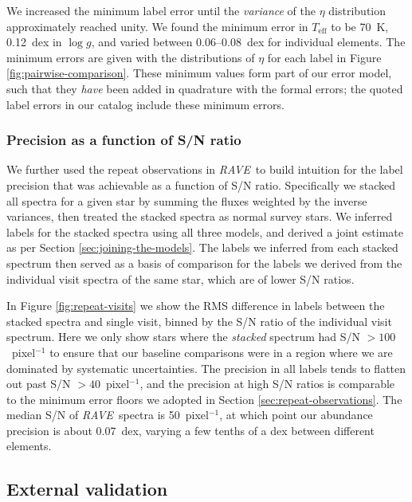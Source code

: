 \documentclass[preprint]{aastex}
\newcommand{\acronym}[1]{{\small{#1}}}
\newcommand{\project}[1]{\textsl{#1}}
\newcommand{\rave}{\project{\acronym{RAVE}}}
\newcommand{\teff}{T_{\mathrm{eff}}}
\newcommand{\logg}{\log g}
\begin{document}
We increased the minimum label error until the \emph{variance} of the $\eta$ 
distribution approximately reached unity.  We found the minimum error in
$\teff$ to be 70~K, 0.12~dex in $\logg$, and varied between 0.06--0.08~dex
for individual elements.  The minimum errors are given with the 
distributions of $\eta$ for each label in Figure \ref{fig:pairwise-comparison}.
These minimum values form part of our error model, such that they \emph{have} 
been added in quadrature with the formal errors; the quoted label errors 
in our catalog include these minimum errors.


\subsubsection{Precision as a function of S/N ratio}
\label{sec:precision-wrt-snr}


We further used the repeat observations in \rave\ to build intuition for
the label precision that was achievable as a function of S/N ratio.  
Specifically we stacked all spectra for a given star by summing the 
fluxes weighted by the inverse variances, then treated the stacked spectra
as normal survey stars.  We inferred labels for the stacked spectra 
using all three models, and derived a joint estimate as per Section 
\ref{sec:joining-the-models}.  The labels we inferred from each stacked 
spectrum then served as a basis of comparison for the labels we derived 
from the individual visit spectra of the same star, which are of lower 
S/N ratios.


In Figure \ref{fig:repeat-visits} we show the RMS difference
in labels between the stacked spectra and single visit, binned by the
S/N ratio of the individual visit spectrum.  Here we only show stars
where the \emph{stacked} spectrum had S/N $>100$~pixel$^{-1}$ to ensure
that our baseline comparisons were in a region where we are dominated
by systematic uncertainties.  The precision in all labels tends to
flatten out past S/N $> 40$~pixel$^{-1}$, and the precision at high S/N
ratios is comparable to the minimum error floors we adopted in Section
\ref{sec:repeat-observations}.  The median S/N of \rave\ spectra is
50~pixel$^{-1}$, at which point our abundance precision is about 
0.07~dex, varying a few tenths of a dex between different elements.


\subsection{External validation}
\label{sec:external-validation}
\end{document}
